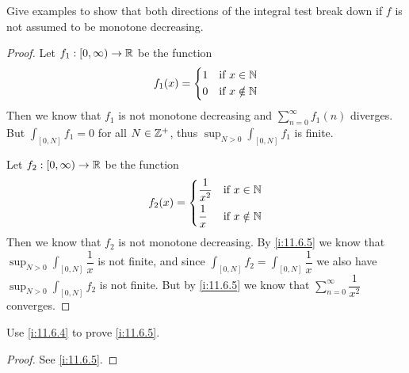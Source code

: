 \begin{ex}\label{i:ex:11.6.4}
  Give examples to show that both directions of the integral test break down if \(f\) is not assumed to be monotone decreasing.
\end{ex}

\begin{proof}
  Let \(f_1 : [0, \infty) \to \mathbb{R}\) be the function
  \[
    f_1(x) = \begin{dcases}
      1 & \text{if } x \in \mathbb{N}    \\
      0 & \text{if } x \notin \mathbb{N}
    \end{dcases}
  \]
  Then we know that \(f_1\) is not monotone decreasing and \(\sum_{n = 0}^\infty f_1(n)\) diverges.
  But \(\int_{[0, N]} f_1 = 0\) for all \(N \in \mathbb{Z}^+\), thus \(\sup_{N > 0} \int_{[0, N]} f_1\) is finite.

  Let \(f_2 : [0, \infty) \to \mathbb{R}\) be the function
  \[
    f_2(x) = \begin{dcases}
      \dfrac{1}{x^2} & \text{if } x \in \mathbb{N}    \\
      \dfrac{1}{x}   & \text{if } x \notin \mathbb{N}
    \end{dcases}
  \]
  Then we know that \(f_2\) is not monotone decreasing.
  By \cref{i:11.6.5} we know that \(\sup_{N > 0} \int_{[0, N]} \dfrac{1}{x}\) is not finite, and since \(\int_{[0, N]} f_2 = \int_{[0, N]} \dfrac{1}{x}\) we also have \(\sup_{N > 0} \int_{[0, N]} f_2\) is not finite.
  But by \cref{i:11.6.5} we know that \(\sum_{n = 0}^\infty \dfrac{1}{x^2}\) converges.
\end{proof}

\begin{ex}\label{i:ex:11.6.5}
  Use \cref{i:11.6.4} to prove \cref{i:11.6.5}.
\end{ex}

\begin{proof}
  See \cref{i:11.6.5}.
\end{proof}
